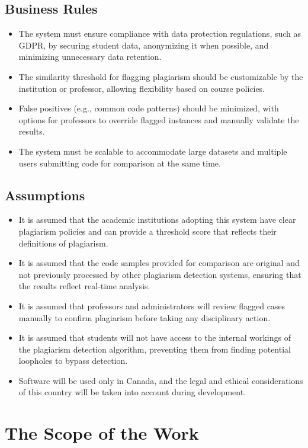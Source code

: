 \documentclass[12pt]{article}
\begin{document}
\subsection{Business Rules}
\begin{itemize}
  \item The system must ensure compliance with data protection regulations, such as GDPR, by securing student data, anonymizing it when possible, and minimizing unnecessary data retention.
  \item The similarity threshold for flagging plagiarism should be customizable by the institution or professor, allowing flexibility based on course policies.
  \item False positives (e.g., common code patterns) should be minimized, with options for professors to override flagged instances and manually validate the results.
  \item The system must be scalable to accommodate large datasets and multiple users submitting code for comparison at the same time.
\end{itemize}
\subsection{Assumptions}
\begin{itemize}
  \item It is assumed that the academic institutions adopting this system have clear plagiarism policies and can provide a threshold score that reflects their definitions of plagiarism.
  \item It is assumed that the code samples provided for comparison are original and not previously processed by other plagiarism detection systems, ensuring that the results reflect real-time analysis.
  \item It is assumed that professors and administrators will review flagged cases manually to confirm plagiarism before taking any disciplinary action.
  \item It is assumed that students will not have access to the internal workings of the plagiarism detection algorithm, preventing them from finding potential loopholes to bypass detection.
  \item Software will be used only in Canada, and the legal and ethical considerations of this country will be taken into account during development.
\end{itemize}

\section{The Scope of the Work}
\end{document}

